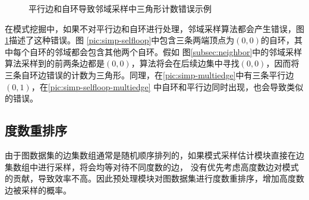 \documentclass[master]{thesis-uestc}
\begin{document}
\begin{figure}
    \caption{平行边和自环导致邻域采样中三角形计数错误示例}
    \label{pic:simp-error}
\end{figure}

    在模式挖掘中，如果不对平行边和自环进行处理，邻域采样算法都会产生错误，图\ref{pic:simp-error}描述了这种错误。图
\ref{pic:simp-selfloop}中包含三条两端顶点为$(0,0)$的自环，其中每个自环的邻域都会包含其他两个自环。假如
图\ref{subsec:neighbor}中的邻域采样算法采样到的前两条边都是$(0,0)$，算法将会在后续边集中寻找$(0,0)$，因而将
三条自环边错误的计数为三角形。同理，在\ref{pic:simp-multiedge}中有三条平行边$(0,1)$，在\ref{pic:simp-selfloop-multiedge}
中自环和平行边同时出现，也会导致类似的错误。


\subsection{度数重排序}
\label{subsec:reorder}
    
    由于图数据集的边集数组通常是随机顺序排列的，如果模式采样估计模块直接在边集数组中进行采样，将会均等对待不同度数的边，
没有优先考虑高度数边对模式的贡献，导致效率不高。因此预处理模块对图数据集进行度数重排序，增加高度数边被采样的概率。
\end{document}
